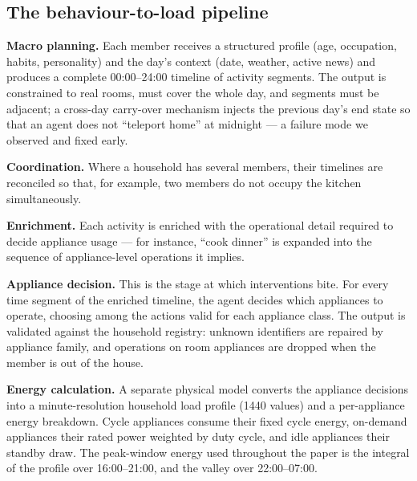 \documentclass[11pt]{article}
\begin{document}
\subsection{The behaviour-to-load pipeline}
\noindent\textbf{Macro planning.} Each member receives a structured profile (age, occupation, habits,
personality) and the day's context (date, weather, active news) and produces a complete 00:00--24:00
timeline of activity segments. The output is constrained to real rooms, must cover the whole day, and
segments must be adjacent; a cross-day carry-over mechanism injects the previous day's end state so that
an agent does not ``teleport home'' at midnight --- a failure mode we observed and fixed early.

\noindent\textbf{Coordination.} Where a household has several members, their timelines are reconciled so
that, for example, two members do not occupy the kitchen simultaneously.

\noindent\textbf{Enrichment.} Each activity is enriched with the operational detail required to decide
appliance usage --- for instance, ``cook dinner'' is expanded into the sequence of appliance-level
operations it implies.

\noindent\textbf{Appliance decision.} This is the stage at which interventions bite. For every time
segment of the enriched timeline, the agent decides which appliances to operate, choosing among the
actions valid for each appliance class. The output is validated against the household registry: unknown
identifiers are repaired by appliance family, and operations on room appliances are dropped when the
member is out of the house.

\noindent\textbf{Energy calculation.} A separate physical model converts the appliance decisions into a
minute-resolution household load profile (1440 values) and a per-appliance energy breakdown. Cycle
appliances consume their fixed cycle energy, on-demand appliances their rated power weighted by duty
cycle, and idle appliances their standby draw. The peak-window energy used throughout the paper is the
integral of the profile over 16:00--21:00, and the valley over 22:00--07:00.
\end{document}
